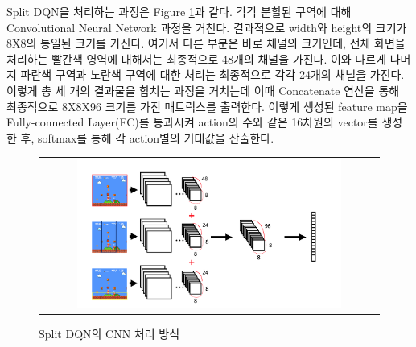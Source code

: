 Split DQN을 처리하는 과정은 Figure \ref{fig:split_dqn}과 같다. 
각각 분할된 구역에 대해 Convolutional Neural Network 과정을 거친다. 
결과적으로 width와 height의 크기가 8X8의 통일된 크기를 가진다. 
여기서 다른 부분은 바로 채널의 크기인데, 전체 화면을 처리하는 빨간색 영역에 대해서는 최종적으로 48개의 채널을 가진다.
이와 다르게 나머지 파란색 구역과 노란색 구역에 대한 처리는 최종적으로 각각 24개의 채널을 가진다. 
이렇게 총 세 개의 결과물을 합치는 과정을 거치는데 이때 Concatenate 연산을 통해 최종적으로 8X8X96 크기를 가진 매트릭스를 출력한다. 
이렇게 생성된 feature map을 Fully-connected Layer(FC)를 통과시켜 action의 수와 같은 16차원의 vector를 생성한 후, softmax를 통해 각 action별의 기대값을 산출한다.
\begin{figure}[ht]
\begin{center}
\begin{tabular}{c}
     \includegraphics[width=0.8\textwidth]{FIG/split_dqn.png} \\
\end{tabular}
\caption{
	Split DQN의 CNN 처리 방식
}
\label{fig:split_dqn}
\end{center}
\end{figure}

